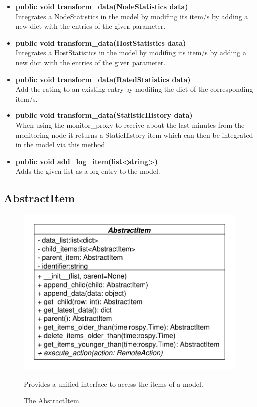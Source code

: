 \begin{itemize}
  \item \textbf{public void transform\_data(NodeStatistics data)}\\ 
  Integrates a NodeStatistics in the model by modifing its item/s by adding a new dict with the entries of the given parameter.
  \item \textbf{public void transform\_data(HostStatistics data)}\\ 
  Integrates a HostStatistics in the model by modifing its item/s by adding a new dict with the entries of the given parameter.
  \item \textbf{public void transform\_data(RatedStatistics data)}\\ 
  Add the rating to an existing entry by modifing the dict of the corresponding
  item/s.
  \item \textbf{public void transform\_data(StatisticHistory data)}\\ 
  When using the monitor\_proxy to receive about the last minutes from the monitoring node
  it returns a StaticHistory item which can then be integrated in the model via this method.
  \item\textbf{public void add\_log\_item(list<string>)}\\
  Adds the given list as a log entry to the model.
  \end{itemize}

\subsection{AbstractItem}
\begin{figure}[htbp]
	\begin{minipage}[t]{7cm}
		\vspace{0pt}
		\centering
		\includegraphics[scale=0.6]{./diagram_pictures/AbstractItem.pdf}
		\caption{The AbstractItem.}
	\end{minipage}
	\hfill
	\begin{minipage}[t]{6cm}
		\vspace{10pt}		
		Provides a unified interface to access the items of a model.
	\end{minipage}
\end{figure}
